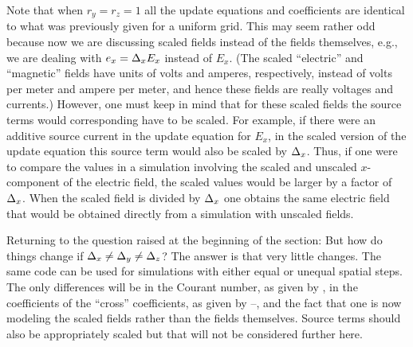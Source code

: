 Note that when $r_y=r_z=1$ all the update equations and coefficients
are identical to what was previously given for a uniform grid.  This
may seem rather odd because now we are discussing scaled fields
instead of the fields themselves, e.g., we are dealing with $e_x=\Delta_x
E_x$ instead of $E_x$.  (The scaled ``electric'' and ``magnetic''
fields have units of volts and amperes, respectively, instead of volts
per meter and ampere per meter, and hence these fields are really
voltages and currents.)  However, one must keep in mind that for these
scaled fields the source terms would corresponding have to be scaled.
For example, if there were an additive source current in the update
equation for $E_x$, in the scaled version of the update equation this
source term would also be scaled by $\Delta_x$.  Thus, if one were to
compare the values in a simulation involving the scaled and unscaled
$x$-component of the electric field, the scaled values would be larger
by a factor of $\Delta_x$.  When the scaled field is divided by $\Delta_x$
one obtains the same electric field that would be obtained directly
from a simulation with unscaled fields.

Returning to the question raised at the beginning of the section: But
how do things change if $\Delta_x\neq\Delta_y\neq\Delta_z$?  The answer is that
very little changes.  The same code can be used for simulations with
either equal or unequal spatial steps.  The only differences will be
in the Courant number, as given by , in
the coefficients of the ``cross'' coefficients, as given by
--, and the fact that one is
now modeling the scaled fields rather than the fields themselves.
Source terms should also be appropriately scaled but that will not be
considered further here.
